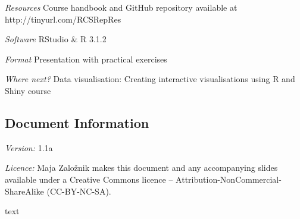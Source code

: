 \emph{Resources}	Course handbook and GitHub repository available at http://tinyurl.com/RCSRepRes

\emph{Software} RStudio \& 	R 3.1.2

\emph{Format}	Presentation with practical exercises

\emph{Where next?}	Data visualisation: Creating interactive visualisations using R and Shiny course

\subsection*{Document Information}

\emph{Version:} 1.1a

\emph{Licence:} Maja Zalo\v znik makes this document and any accompanying slides available under a Creative Commons licence – Attribution-NonCommercial- ShareAlike (CC-BY-NC-SA).


\newpage
{\color{white}text}

\newpage